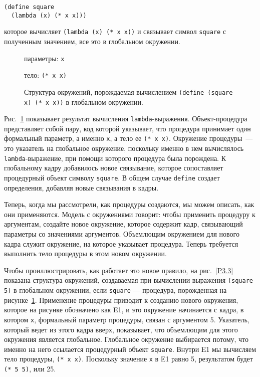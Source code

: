 \begin{Verbatim}[fontsize=\small]
(define square
  (lambda (x) (* x x)))
\end{Verbatim}
которое вычисляет
{\tt (lambda (x) (* x x))} и связывает символ
{\tt square} с полученным значением, все это в глобальном
окружении.


\begin{figure}
\begin{center}

\end{center}
\hspace{5cm}параметры: {\tt x}

\hspace{5cm}тело: {\tt (* x x)}

\caption{Структура окружений, порождаемая вычислением
{\tt (define (square x) (* x x))} в глобальном окружении.}
\label{P3.2}
\end{figure}

Рис.~\ref{P3.2} показывает результат вычисления
{\tt lambda}-выражения.  Объект-про\-це\-дура представляет собой пару, код
которой указывает, что процедура принимает один формальный параметр, а
именно {\tt x}, а тело ее {\tt (* x x)}.  Окружение
процедуры~--- это указатель на глобальное окружение, поскольку именно
в нем вычислялось {\tt lambda}-выражение, при помощи которого
процедура была порождена.  К глобальному кадру добавилось новое
связывание, которое сопоставляет процедурный объект символу
{\tt square}.  В общем случае {\tt define} создает
определения, добавляя новые связывания в кадры.

Теперь, когда мы рассмотрели, как процедуры создаются, мы
можем описать, как они применяются.  Модель с окружениями говорит:
чтобы применить процедуру к аргументам, создайте новое окружение,
которое содержит кадр, связывающий параметры со значениями
аргументов.  Объемлющим окружением для нового кадра служит окружение,
на которое указывает процедура.  Теперь требуется выполнить тело
процедуры в этом новом окружении.

Чтобы проиллюстрировать, как работает это новое правило,
на рис.~\ref{P3.3} показана структура окружений, создаваемая
 при вычислении выражения {\tt (square 5)} в
глобальном окружении, если {\tt square} --- процедура,
порожденная на рисунке~\ref{P3.2}.  Применение процедуры
приводит к созданию нового окружения, которое на рисунке обозначено
как E1, и это окружение начинается с кадра, в котором {\tt x},
формальный параметр процедуры, связан с аргументом 5.  Указатель,
который ведет из этого кадра вверх, показывает, что объемлющим для
этого окружения является глобальное.  Глобальное окружение выбирается
потому, что именно на него ссылается процедурный объект
{\tt square}. Внутри E1 мы вычисляем тело процедуры, {\tt (* x
x)}.  Поскольку значение {\tt x} в E1 равно 5,
результатом будет {\tt (* 5 5)}, или 25.


